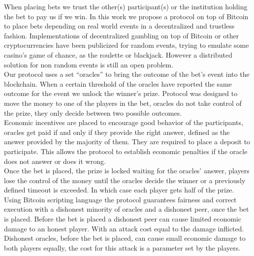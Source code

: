 When placing bets we trust the other(s) participant(s) or the institution
  holding the bet to pay us if we win.
In this work we propose a protocol on top of Bitcoin to place bets depending on
  real world events in a decentralized and trustless fashion.
Implementations of decentralized gambling on top of Bitcoin or other
  cryptocurrencies have been publicized for random events, trying to emulate
  some casino's game of chance, as the roulette or blackjack.
However a distributed solution for non random events is still an open problem.\\
\noindent
Our protocol uses a set ``oracles'' to bring the outcome of the bet's event into
  the blockchain.
When a certain threshold of the oracles have reported the same outcome for
  the event we unlock the winner's prize.
Protocol was designed to move the money to one of the players in the bet,
  oracles do not take control of the prize, they only decide between two
  possible outcomes.\\
\noindent
Economic incentives are placed to encourage good behavior of the participants,
  oracles get paid if and only if they provide the right answer, defined as the
  answer provided by the majority of them.
They are required to place a deposit to participate.
This allows the protocol to establish economic penalties if the oracle does not
  answer or does it wrong.\\
\noindent
Once the bet is placed, the prize is locked waiting for the oracles' answer,
  players lose the control of the money until the oracles decide the winner
  or a previously defined timeout is exceeded.
In which case each player gets half of the prize.\\
\noindent
Using Bitcoin scripting language the protocol guarantees fairness and correct
  execution with a dishonest minority of oracles and a dishonest peer, once the
  bet is placed.
Before the bet is placed a dishonest peer can cause limited economic damage to
  an honest player.
With an attack cost equal to the damage inflicted.
Dishonest oracles, before the bet is placed, can cause small economic damage to
  both players equally, the cost for this attack is a parameter set by the
  players.\\
\noindent
